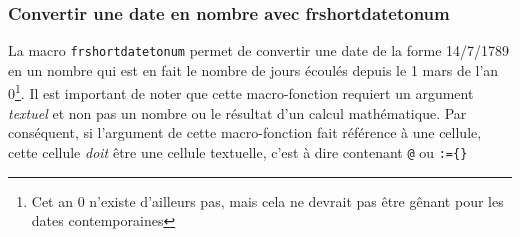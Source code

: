 \documentclass[a4paper,10pt]{article}
\newcommand\verbinline[1][]{\lstinline[breaklines=false,basicstyle=\normalsize\ttfamily,#1]}
\begin{document}
\subsubsection{Convertir une date en nombre avec \ttfamily frshortdatetonum}\label{datetonum}
La macro \verbinline-frshortdatetonum- permet de convertir une date de la forme 14/7/1789 en un nombre qui est en fait le nombre de jours écoulés depuis le 1\ier{} mars de l'an 0\footnote{Cet \og an 0\fg{} n'existe d'ailleurs pas, mais cela ne devrait pas être gênant pour les dates contemporaines}. Il est important de noter que cette macro-fonction requiert un argument \emph{textuel} et non pas un nombre ou le résultat d'un calcul mathématique. Par conséquent, si l'argument de cette macro-fonction fait référence à une cellule, cette cellule \emph{doit} être une cellule textuelle, c'est à dire contenant \og\verb-@-\fg{} ou \og\verb-:={}-\fg{}
\end{document}
